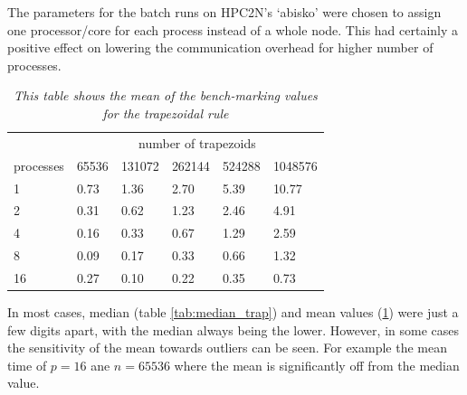 \documentclass[a4paper,11pt,twoside]{article}
\begin{document}
The parameters for the batch runs on HPC2N's `abisko' were chosen to assign one processor/core for each process instead of a whole node. This had certainly a positive effect on lowering the communication overhead for higher number of processes. 

\begin{table}[]
\centering
\caption{\textit{This table shows the mean of the bench-marking values for the trapezoidal rule}}
\label{tab:mean_trap}
\begin{tabular}{llllll}
\multicolumn{1}{l|}{}          & \multicolumn{5}{c}{number of trapezoids}                                                                                       \\ \cline{2-6} 
\multicolumn{1}{l|}{processes} & \multicolumn{1}{l|}{65536} & \multicolumn{1}{l|}{131072} & \multicolumn{1}{l|}{262144} & \multicolumn{1}{l|}{524288} & 1048576 \\ \hline
1                              & 0.73                       & 1.36                        & 2.70                        & 5.39                        & 10.77   \\
2                              & 0.31                       & 0.62                        & 1.23                        & 2.46                        & 4.91    \\
4                              & 0.16                       & 0.33                        & 0.67                        & 1.29                        & 2.59    \\
8                              & 0.09                       & 0.17                        & 0.33                        & 0.66                        & 1.32    \\
16                             & 0.27                       & 0.10                        & 0.22                        & 0.35                        & 0.73   
\end{tabular}
\end{table}

In most cases, median (table \ref{tab:median_trap}) and mean values (\ref{tab:mean_trap}) were just a few digits apart, with the median always being the lower. However, in some cases the sensitivity of the mean towards outliers can be seen. For example the mean time of $p = 16$ ane $n = 65536$ where the mean is significantly off from the median value. 
\end{document}
